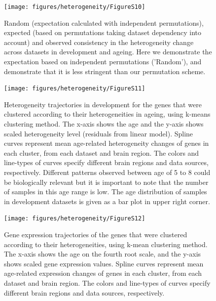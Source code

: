 \documentclass[12pt,twoside]{unicam}
\begin{document}
\begin{figure}

{\centering \texttt{[image: figures/heterogeneity/FigureS10]} 

}

\caption[Random, expected, and observed consistency in the heterogeneity change across datasets in development and ageing.]{Random (expectation calculated with independent permutations), expected (based on permutations taking dataset dependency into account) and observed consistency in the heterogeneity change across datasets in development and ageing. Here we demonstrate the expectation based on independent permutations ('Random'), and demonstrate that it is less stringent than our permutation scheme.}\label{fig:hetFigS10}
\end{figure}

\begin{figure}

{\centering \texttt{[image: figures/heterogeneity/FigureS11]} 

}

\caption[Heterogeneity trajectories in development for the genes that were clustered according to their heterogeneities in ageing.]{Heterogeneity trajectories in development for the genes that were clustered according to their heterogeneities in ageing, using k-means clustering method. The x-axis shows the age and the y-axis shows scaled heterogeneity level (residuals from linear model). Spline curves represent mean age-related heterogeneity changes of genes in each cluster, from each dataset and brain region. The colors and line-types of curves specify different brain regions and data sources, respectively. Different patterns observed between age of 5 to 8 could be biologically relevant but it is important to note that the number of samples in this age range is low. The age distribution of samples in development datasets is given as a bar plot in upper right corner.}\label{fig:hetFigS11}
\end{figure}

\begin{figure}

{\centering \texttt{[image: figures/heterogeneity/FigureS12]} 

}

\caption[Gene expression trajectories of the genes that were clustered according to their heterogeneities.]{Gene expression trajectories of the genes that were clustered according to their heterogeneities, using k-mean clustering method. The x-axis shows the age on the fourth root scale, and the y-axis shows scaled gene expression values. Spline curves represent mean age-related expression changes of genes in each cluster, from each dataset and brain region. The colors and line-types of curves specify different brain regions and data sources, respectively.}\label{fig:hetFigS12}
\end{figure}
\end{document}
